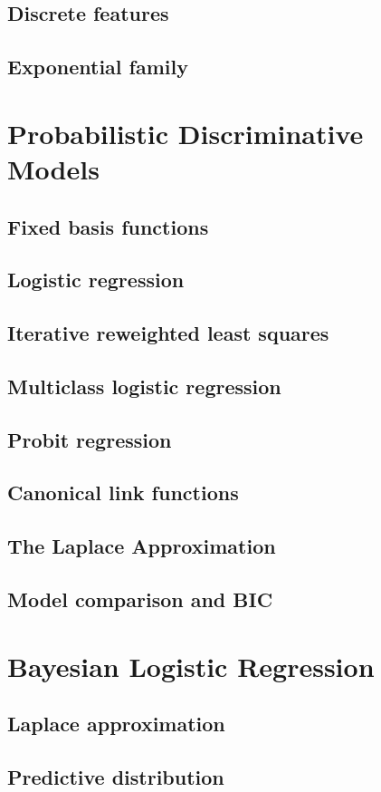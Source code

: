 \subsection{Discrete features}


\subsection{Exponential family}


\section{Probabilistic Discriminative Models}
\subsection{Fixed basis functions}
\subsection{Logistic regression}
\subsection{Iterative reweighted least squares}
\subsection{Multiclass logistic regression}
\subsection{Probit regression}
\subsection{Canonical link functions}

\subsection{The Laplace Approximation}
\subsection{Model comparison and BIC}

\section{Bayesian Logistic Regression}
\subsection{Laplace approximation}
\subsection{Predictive distribution}